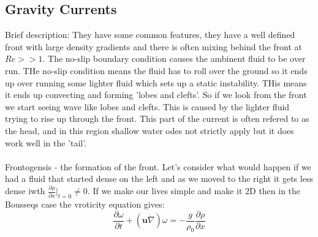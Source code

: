 \documentclass{article}
\begin{document}
\subsection{Gravity Currents}
Brief description: They have some common features, they have a well defined front with large density gradients and there is often mixing behind the front at $Re >>1$. The no-slip boundary condition causes the ambinent fluid to be over run. THe no-slip condition means the fluid has to roll over the ground so it ends up over running some lighter fluid which sets up a static instability. THis means it ends up convecting and forming 'lobes and clefts'. So if we look from the front we start seeing wave like lobes and clefts. This is caused by the lighter fluid trying to rise up through the front. This part of the current is often refered to as the head, and in this region shallow water odes not strictly apply but it does work well in the 'tail'.\\\\
Frontogensis - the formation of the front. Let's consider what would happen if we had a fluid that started dense on the left and as we moved to the right it gets less dense iwth $\frac{\partial \rho}{\partial x}|_{t=0} \neq 0$. If we make our lives simple and make it 2D then in the Bousseqs case the vroticity equation gives:
$$
 \frac{\partial \omega}{\partial t} + ( \bm u \dot \nabla) \omega = - \frac{g}{\rho_0}\frac{\partial \rho}{\partial x}
$$
\end{document}
